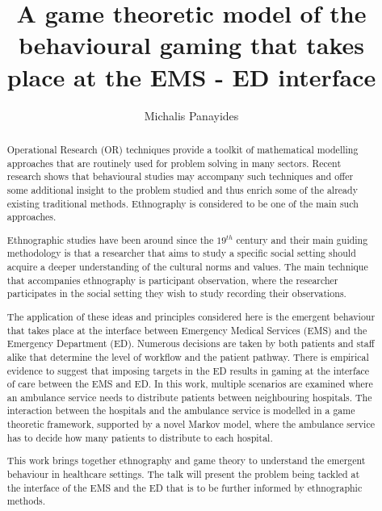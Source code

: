 \documentclass{article}
\title{A game theoretic model of the behavioural gaming that takes place at the EMS
 - ED interface}
\author{Michalis Panayides}
\begin{document}
\maketitle
\begin{abstract}
    Operational Research (OR) techniques provide a toolkit of mathematical 
    modelling approaches that are routinely used for problem solving in many
    sectors. Recent research shows that behavioural studies may accompany such
    techniques and offer some additional insight to the problem studied and 
    thus enrich some of the already existing traditional methods. Ethnography is 
    considered to be one of the main such approaches.

    Ethnographic studies have been around since the \(19^{th}\) century and
    their main guiding methodology is that a researcher that aims to study 
    a specific social setting should acquire a deeper understanding of the 
    cultural norms and values. The main technique that accompanies ethnography 
    is participant observation, where the researcher participates in the social 
    setting they wish to study recording their observations.

    The application of these ideas and principles considered here is the emergent 
    behaviour that takes place at the interface between Emergency Medical Services 
    (EMS) and the Emergency Department (ED). Numerous decisions are taken by both 
    patients and staff alike that determine the level of workflow and the patient 
    pathway. There is empirical evidence to suggest that imposing targets in the ED 
    results in gaming at the interface of care between the EMS and ED. In this work,
    multiple scenarios are examined where an ambulance service needs to distribute 
    patients between neighbouring hospitals. The interaction between the hospitals 
    and the ambulance service is modelled in a game theoretic framework, supported by 
    a novel Markov model, where the ambulance service has to decide how many patients 
    to distribute to each hospital.

    This work brings together ethnography and game theory to understand the emergent
    behaviour in healthcare settings. The talk will present the problem being tackled
    at the interface of the EMS and the ED that is to be further informed by ethnographic methods.
        
\end{abstract}
    
\end{document}
